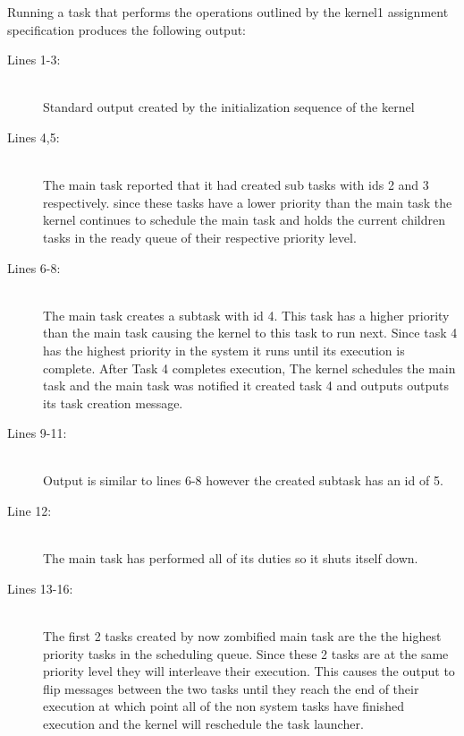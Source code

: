 \documentclass[pdftex,10pt,a4paper]{article}
\begin{document}
Running a task that performs the operations outlined by the kernel1 assignment
specification produces the following output:



\begin{description}
\item[Lines 1-3:] \hfill \\
Standard output created by the initialization sequence of the kernel

\item[Lines 4,5:] \hfill \\
The main task reported that it had created sub tasks with ids 2 and 3 respectively.
since these tasks have a lower priority than the main task the kernel continues
to schedule the main task and holds the current children tasks in the ready
queue of their respective priority level.

\item[Lines 6-8:] \hfill \\
The main task creates a subtask with id 4. This task has a higher priority than
the main task causing the kernel to this task to run next. Since task 4 has the
highest priority in the system it runs until its execution is complete. After
Task 4 completes execution, The kernel schedules the main task and the main task
was notified it created task 4 and outputs outputs its task creation message.

\item[Lines 9-11:] \hfill \\
Output is similar to lines 6-8 however the created subtask has an id of 5.

\item[Line 12:] \hfill \\
The main task has performed all of its duties so it shuts itself down.

\item[Lines 13-16:] \hfill \\
The first 2 tasks created by now zombified main task are the the highest
priority tasks in the scheduling queue. Since these 2 tasks are at the same
priority level they will interleave their execution. This causes the output to
flip messages between the two tasks until they reach the end of their execution
at which point all of the non system tasks have finished execution and the kernel
will reschedule the task launcher.

\end{description}
\end{document}
